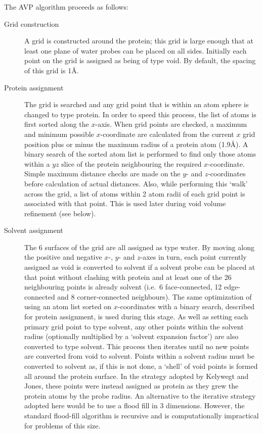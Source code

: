 \documentclass{article}
\let\shortcite\cite
\begin{document}
The AVP algorithm proceeds as follows:
\begin{description}

\item[Grid construction] A grid is constructed around the protein;
this grid is large enough that at least one plane of water probes can be
placed on all sides. Initially each point on the grid is assigned as
being of type void. By default, the spacing of this grid is 1\AA.

\item[Protein assignment] The grid is searched and any grid point that
is within an atom sphere is changed to type protein. In order to speed
this process, the list of atoms is first sorted along the
$x$-axis. When grid points are checked, a maximum and minimum possible
$x$-coordinate are calculated from the current $x$ grid position plus
or minus the maximum radius of a protein atom (1.9\AA). A binary
search of the sorted atom list is performed to find only those atoms
within a $yz$ slice of the protein neighbouring the required
$x$-coordinate. Simple maximum distance checks are made on the $y$-
and $z$-coordinates before calculation of actual distances.  Also,
while performing this `walk' across the grid, a list of atoms within 2
atom radii of each grid point is associated with that point. This is
used later during void volume refinement (see below).

\item[Solvent assignment] The 6 surfaces of the grid are all assigned
as type water. By moving along the positive and negative $x$-, $y$-
and $z$-axes in turn, each point currently assigned as void is
converted to solvent if a solvent probe can be placed at that point
without clashing with protein and at least one of the 26 neighbouring
points is already solvent (i.e.\ 6 face-connected, 12 edge-connected
and 8 corner-connected neighbours). The same optimization of using an
atom list sorted on $x$-coordinates with a binary search, described
for protein assignment, is used during this stage. As well as setting
each primary grid point to type solvent, any other points within the
solvent radius (optionally multiplied by a `solvent expansion factor')
are also converted to type solvent. This process then iterates until
no new points are converted from void to solvent.  Points within a
solvent radius must be converted to solvent as, if this is not done, a
`shell' of void points is formed all around the protein surface. In
the strategy adopted by Kelywegt and Jones\shortcite{kleywegt:voidoo},
these points were instead assigned as protein as they grew the protein
atoms by the probe radius. An alternative to the iterative strategy
adopted here would be to use a flood fill in 3 dimensions. However,
the standard flood-fill algorithm is recursive and is computationally
impractical for problems of this size.


\end{description}
\end{document}
